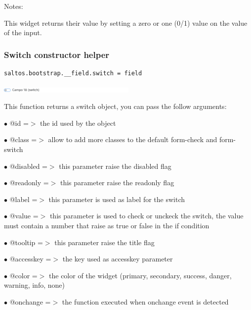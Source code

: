 \documentclass[a4paper]{article}
\begin{document}
Notes:

This widget returns their value by setting a zero or one (0/1) value on the value of the input.

\hypertarget{toc66}{}
\subsubsection{Switch constructor helper}

\begin{lstlisting}
saltos.bootstrap.__field.switch = field
\end{lstlisting}

\begin{center}\includegraphics[width=0.5\textwidth]{../ujest/snaps/test-bootstrap-js-bootstrap-campo-18-switch-1-snap.png}\end{center}

This function returns a switch object, you can pass the follow arguments:

\begin{compactitem}
\item[\color{myblue}$\bullet$] @id        =$>$ the id used by the object
\item[\color{myblue}$\bullet$] @class     =$>$ allow to add more classes to the default form-check and form-switch
\item[\color{myblue}$\bullet$] @disabled  =$>$ this parameter raise the disabled flag
\item[\color{myblue}$\bullet$] @readonly  =$>$ this parameter raise the readonly flag
\item[\color{myblue}$\bullet$] @label     =$>$ this parameter is used as label for the switch
\item[\color{myblue}$\bullet$] @value     =$>$ this parameter is used to check or unckeck the switch, the value
              must contain a number that raise as true or false in the if condition
\item[\color{myblue}$\bullet$] @tooltip   =$>$ this parameter raise the title flag
\item[\color{myblue}$\bullet$] @accesskey =$>$ the key used as accesskey parameter
\item[\color{myblue}$\bullet$] @color     =$>$ the color of the widget (primary, secondary, success, danger, warning, info, none)
\item[\color{myblue}$\bullet$] @onchange  =$>$ the function executed when onchange event is detected
\end{compactitem}
\end{document}
